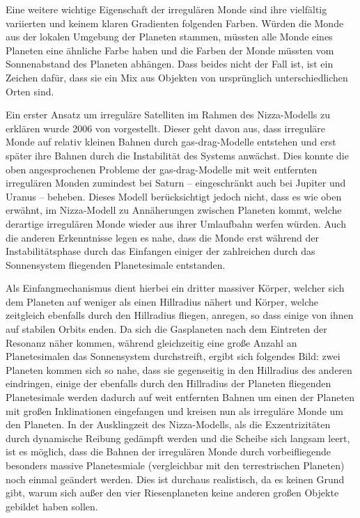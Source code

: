 \documentclass[12pt,a4paper,twoside]{article}
\renewcommand{\cite}{\citep}
\begin{document}
Eine weitere wichtige Eigenschaft der irregulären Monde sind ihre vielfältig variierten und keinem klaren Gradienten folgenden Farben. Würden die Monde aus der lokalen Umgebung der Planeten stammen, müssten alle Monde eines Planeten eine ähnliche Farbe haben und die Farben der Monde müssten vom Sonnenabstand des Planeten abhängen\cite{Nesvorny2007}. Dass beides nicht der Fall ist, ist ein Zeichen dafür, dass sie ein Mix aus Objekten von ursprünglich unterschiedlichen Orten sind. %

Ein erster Ansatz um irreguläre Satelliten im Rahmen des Nizza-Modells zu erklären wurde 2006 von \cite{Cuk2006} vorgestellt. Dieser geht davon aus, dass irreguläre Monde auf relativ kleinen Bahnen durch \glqq gas-drag\grqq-Modelle entstehen und erst später ihre Bahnen durch die Instabilität des Systems anwächst. Dies konnte die oben angesprochenen Probleme der \glqq gas-drag\grqq-Modelle mit weit entfernten irregulären Monden zumindest bei Saturn – eingeschränkt auch bei Jupiter und Uranus – beheben\cite{Cuk2006}. %
Dieses Modell berücksichtigt jedoch nicht, dass es wie oben erwähnt, im Nizza-Modell zu Annäherungen zwischen Planeten kommt, welche derartige irregulären Monde wieder aus ihrer Umlaufbahn werfen würden. Auch die anderen Erkenntnisse legen es nahe, dass die Monde erst während der Instabilitätsphase durch das Einfangen einiger der zahlreichen durch das Sonnensystem fliegenden Planetesimale entstanden. %

Als Einfangmechanismus dient hierbei ein dritter massiver Körper,
welcher sich dem Planeten auf weniger als einen Hillradius nähert und Körper, %
welche zeitgleich ebenfalls durch den Hillradius fliegen, anregen, so dass einige von ihnen auf stabilen Orbits enden. %
Da sich die Gasplaneten nach dem Eintreten der Resonanz näher kommen, während gleichzeitig eine große Anzahl an Planetesimalen das Sonnensystem durchstreift,
ergibt sich folgendes Bild: zwei Planeten kommen sich so nahe, dass sie gegenseitig in den Hillradius des anderen eindringen,
einige der ebenfalls durch den Hillradius der Planeten fliegenden Planetesimale werden dadurch auf weit entfernten Bahnen um einen der Planeten mit großen Inklinationen eingefangen und %
kreisen nun als irreguläre Monde um den Planeten\cite{Nesvorny2007}.
In der Ausklingzeit des Nizza-Modells, als die Exzentrizitäten durch dynamische Reibung gedämpft werden und die Scheibe sich langsam leert, ist es möglich, dass die Bahnen der irregulären Monde durch vorbeifliegende besonders massive Planetesmiale (vergleichbar mit den terrestrischen Planeten) noch einmal geändert werden. %
Dies ist durchaus realistisch, da es keinen Grund gibt, warum sich außer den vier Riesenplaneten keine anderen großen Objekte gebildet haben sollen\cite{Nesvorny2007}. %
\end{document}

